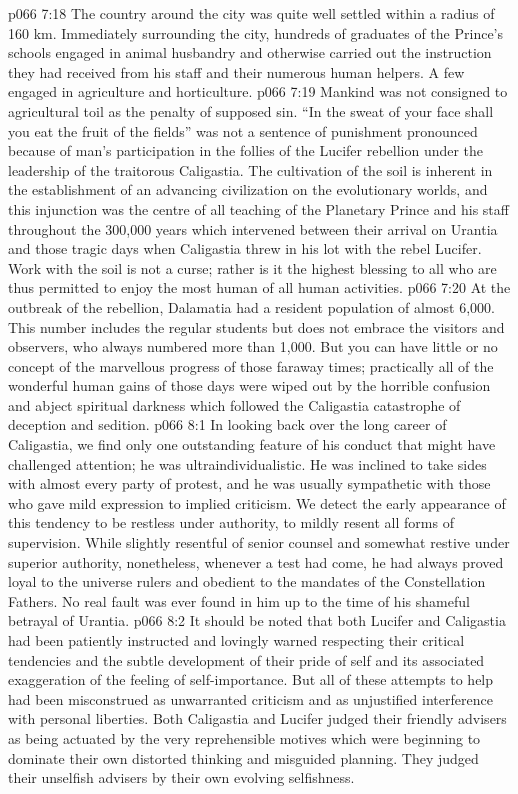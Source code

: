 \vs p066 7:18 \pc The country around the city was quite well settled within a radius of 160 km. Immediately surrounding the city, hundreds of graduates of the Prince’s schools engaged in animal husbandry and otherwise carried out the instruction they had received from his staff and their numerous human helpers. A few engaged in agriculture and horticulture.
\vs p066 7:19 Mankind was not consigned to agricultural toil as the penalty of supposed sin. “In the sweat of your face shall you eat the fruit of the fields” was not a sentence of punishment pronounced because of man’s participation in the follies of the Lucifer rebellion under the leadership of the traitorous Caligastia. The cultivation of the soil is inherent in the establishment of an advancing civilization on the evolutionary worlds, and this injunction was the centre of all teaching of the Planetary Prince and his staff throughout the 300,000 years which intervened between their arrival on Urantia and those tragic days when Caligastia threw in his lot with the rebel Lucifer. Work with the soil is not a curse; rather is it the highest blessing to all who are thus permitted to enjoy the most human of all human activities.
\vs p066 7:20 At the outbreak of the rebellion, Dalamatia had a resident population of almost 6,000. This number includes the regular students but does not embrace the visitors and observers, who always numbered more than 1,000. But you can have little or no concept of the marvellous progress of those faraway times; practically all of the wonderful human gains of those days were wiped out by the horrible confusion and abject spiritual darkness which followed the Caligastia catastrophe of deception and sedition.
\vs p066 8:1 In looking back over the long career of Caligastia, we find only one outstanding feature of his conduct that might have challenged attention; he was ultraindividualistic. He was inclined to take sides with almost every party of protest, and he was usually sympathetic with those who gave mild expression to implied criticism. We detect the early appearance of this tendency to be restless under authority, to mildly resent all forms of supervision. While slightly resentful of senior counsel and somewhat restive under superior authority, nonetheless, whenever a test had come, he had always proved loyal to the universe rulers and obedient to the mandates of the Constellation Fathers. No real fault was ever found in him up to the time of his shameful betrayal of Urantia.
\vs p066 8:2 It should be noted that both Lucifer and Caligastia had been patiently instructed and lovingly warned respecting their critical tendencies and the subtle development of their pride of self and its associated exaggeration of the feeling of self\hyp{}importance. But all of these attempts to help had been misconstrued as unwarranted criticism and as unjustified interference with personal liberties. Both Caligastia and Lucifer judged their friendly advisers as being actuated by the very reprehensible motives which were beginning to dominate their own distorted thinking and misguided planning. They judged their unselfish advisers by their own evolving selfishness.
